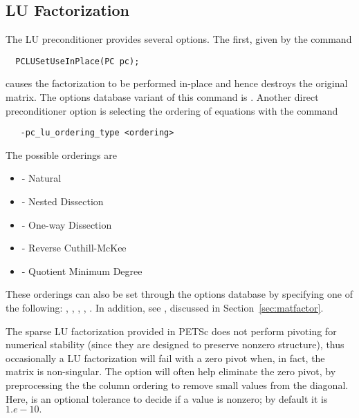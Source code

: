 \subsection{LU Factorization}

The LU preconditioner provides several options.  The first, given by
the 
command  
\begin{verbatim}
  PCLUSetUseInPlace(PC pc);
\end{verbatim}
causes the factorization to be performed in-place and hence
destroys the original matrix.  The options database variant of
this command is . 
Another direct preconditioner option is selecting the ordering
of equations with the command  
\begin{verbatim}
   -pc_lu_ordering_type <ordering>
\end{verbatim}
The possible orderings are
\begin{itemize}
\item {} - Natural
\item {} - Nested Dissection
\item {} - One-way Dissection
\item {} - Reverse Cuthill-McKee
\item {} - Quotient Minimum Degree
\end{itemize}
  
  
  
 
These orderings can also be set through the options database by specifying 
one of the following:   , 
,  ,  ,
 .
In addition, see 
\break {}, discussed in Section~\ref{sec:matfactor}.

The sparse LU factorization provided in PETSc does not perform pivoting for 
numerical stability (since they are designed to preserve nonzero 
structure), thus occasionally a LU factorization will fail with a zero 
pivot when, in fact, the matrix is non-singular. The option
 
will often help eliminate the zero pivot, by preprocessing the the 
column ordering to remove small values from the diagonal. Here, 
is an optional tolerance to decide if a value is nonzero; by default it
is $ 1.e-10.$ 


